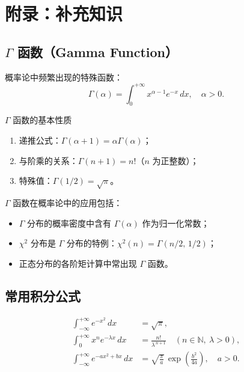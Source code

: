 \chapter*{附录：补充知识}
\setcounter{chapter}{0}
\renewcommand{\thechapter}{\Alph{chapter}}

\section{$\Gamma$ 函数（Gamma Function）}

概率论中频繁出现的特殊函数：
\[\Gamma(\alpha) = \int_{0}^{+\infty} x^{\alpha-1} e^{-x}\,dx,\quad \alpha > 0.\]

\begin{myproperty}{$\Gamma$ 函数的基本性质}
\begin{enumerate}
	\item 递推公式：$\Gamma(\alpha + 1) = \alpha \Gamma(\alpha)$；
	\item 与阶乘的关系：$\Gamma(n + 1) = n!$（$n$ 为正整数）；
	\item 特殊值：$\Gamma(1/2) = \sqrt{\pi}$。
\end{enumerate}
\end{myproperty}

$\Gamma$ 函数在概率论中的应用包括：
\begin{itemize}
	\item $\Gamma$ 分布的概率密度中含有 $\Gamma(\alpha)$ 作为归一化常数；
	\item $\chi^2$ 分布是 $\Gamma$ 分布的特例：$\chi^2(n) = \Gamma(n/2,\, 1/2)$；
	\item 正态分布的各阶矩计算中常出现 $\Gamma$ 函数。
\end{itemize}

\section{常用积分公式}

\begin{myformula}
\[
\begin{aligned}
    \int_{-\infty}^{+\infty} e^{-x^2}\,dx &= \sqrt{\pi}, \\
    \int_{0}^{+\infty} x^{n} e^{-\lambda x}\,dx &= \frac{n!}{\lambda^{\,n+1}} \quad (n \in \mathbb{N},\ \lambda > 0), \\
    \int_{-\infty}^{+\infty} e^{-ax^2 + bx}\,dx &= \sqrt{\frac{\pi}{a}}\, \exp\!\left(\frac{b^2}{4a}\right),\quad a > 0.
\end{aligned}
\]
\end{myformula}

